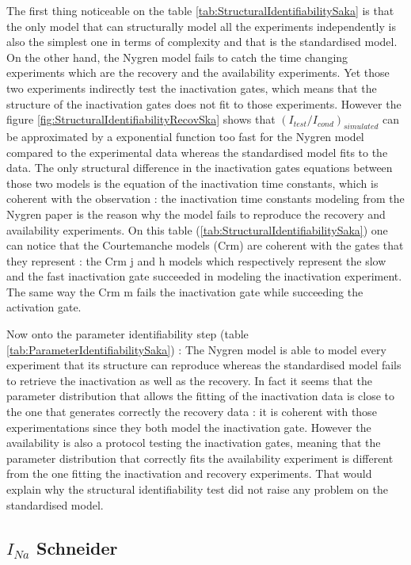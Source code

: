 \documentclass[11pt]{report}
\begin{document}
The first thing noticeable on the table \ref{tab:StructuralIdentifiabilitySaka} is that the only model that can structurally model all the experiments independently is also the simplest one in terms of complexity and that is the standardised model. On the other hand, the Nygren \cite{Nygren1998} model fails to catch the time changing experiments which are the recovery and the availability experiments. Yet those two experiments indirectly test the inactivation gates, which means that the structure of the inactivation gates does not fit to those experiments. However the figure \ref{fig:StructuralIdentifiabilityRecovSka} shows that $(I_{test}/I_{cond})_{simulated}$ can be approximated by a exponential function too fast for the Nygren \cite{Nygren1998} model compared to the experimental data whereas the standardised model fits to the data. The only structural difference in the inactivation gates equations between those two models is the equation of the inactivation time constants, which is coherent with the observation : the inactivation time constants modeling from the Nygren paper \cite{Nygren1998} is the reason why the model fails to reproduce the recovery and availability experiments.
On this table (\ref{tab:StructuralIdentifiabilitySaka}) one can notice that the Courtemanche \cite{Courtemanche1998} models (Crm) are coherent with the gates that they represent : the Crm j and h models which respectively represent the slow and the fast inactivation gate succeeded in modeling the inactivation experiment. The same way the Crm m fails the inactivation gate while succeeding the activation gate.

Now onto the parameter identifiability step (table \ref{tab:ParameterIdentifiabilitySaka}) : The Nygren model \cite{Nygren1998} is able to model every experiment that its structure can reproduce whereas the standardised model fails to retrieve the inactivation as well as the recovery. In fact it seems that the parameter distribution that allows the fitting of the inactivation data is close to the one that generates correctly the recovery data : it is coherent with those experimentations since they both model the inactivation gate. However the availability is also a protocol testing the inactivation gates, meaning that the parameter distribution that correctly fits the availability experiment is different from the one fitting the inactivation and recovery experiments. That would explain why the structural identifiability test did not raise any problem on the standardised model. 


\subsection{$I_{Na}$ Schneider \cite{Schneider1994}}
\end{document}
